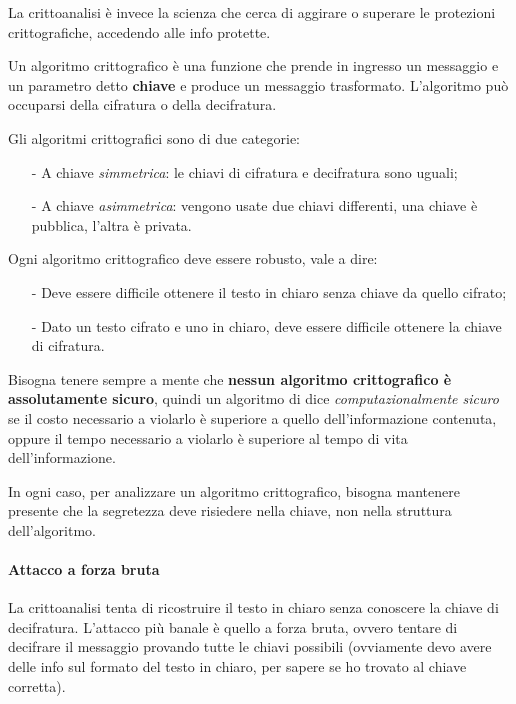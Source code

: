 \documentclass[a4paper, 10pt]{report}
\begin{document}
\noindent La crittoanalisi è invece la scienza che cerca di aggirare o superare le protezioni crittografiche, accedendo alle info protette.

\noindent Un algoritmo crittografico è una funzione che prende in ingresso un messaggio e un parametro detto \textbf{chiave} e produce un messaggio trasformato. L'algoritmo può occuparsi della cifratura o della decifratura.

Gli algoritmi crittografici sono di due categorie:
		\begin{itemize}
			\item[-] A chiave \textit{simmetrica}: le chiavi di cifratura e decifratura sono uguali;
			\item[-] A chiave \textit{asimmetrica}: vengono usate due chiavi differenti, una chiave è pubblica, l'altra è privata.
		\end{itemize}
	
\noindent Ogni algoritmo crittografico deve essere robusto, vale a dire:
		\begin{itemize}
			\item[-] Deve essere difficile ottenere il testo in chiaro senza chiave da quello cifrato;
			\item[-] Dato un testo cifrato e uno in chiaro, deve essere difficile ottenere la chiave di cifratura.
		\end{itemize}
	
\noindent Bisogna tenere sempre a mente che \textbf{nessun algoritmo crittografico è assolutamente sicuro}, quindi un algoritmo di dice \textit{computazionalmente sicuro} se il costo necessario a violarlo è superiore a quello dell'informazione contenuta, oppure il tempo necessario a violarlo è superiore al tempo di vita dell'informazione.
		
\noindent In ogni caso, per analizzare un algoritmo crittografico, bisogna mantenere presente che la segretezza deve risiedere nella chiave, non nella struttura dell'algoritmo.

\paragraph*{Attacco a forza bruta} La crittoanalisi tenta di ricostruire il testo in chiaro senza conoscere la chiave di decifratura. L'attacco più banale è quello a forza bruta, ovvero tentare di decifrare il messaggio provando tutte le chiavi possibili (ovviamente devo avere delle info sul formato del testo in chiaro, per sapere se ho trovato al chiave corretta).
\end{document}
